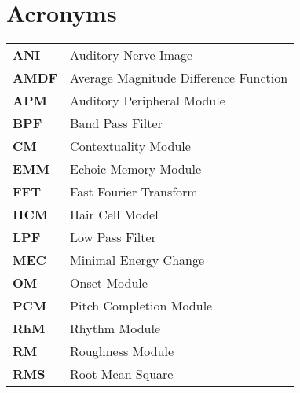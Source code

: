 
\chapter*{Acronyms}
\hypertarget{Chapter:Acronyms}{}

\begin{table}[!h]
\begin{tabular}[pos]{ll}
\textbf{ANI}&Auditory Nerve Image\\
\textbf{AMDF}&Average Magnitude Difference Function\\
\textbf{APM}&Auditory Peripheral Module\\
\textbf{BPF}&Band Pass Filter\\
\textbf{CM}&Contextuality Module\\
\textbf{EMM}&Echoic Memory Module\\
\textbf{FFT}&Fast Fourier Transform\\
\textbf{HCM}&Hair Cell Model\\
\textbf{LPF}&Low Pass Filter\\
\textbf{MEC}&Minimal Energy Change\\
\textbf{OM}&Onset Module\\
\textbf{PCM}&Pitch Completion Module\\
\textbf{RhM}&Rhythm Module\\
\textbf{RM}&Roughness Module\\
\textbf{RMS}&Root Mean Square\\
\end{tabular}
\end{table}
